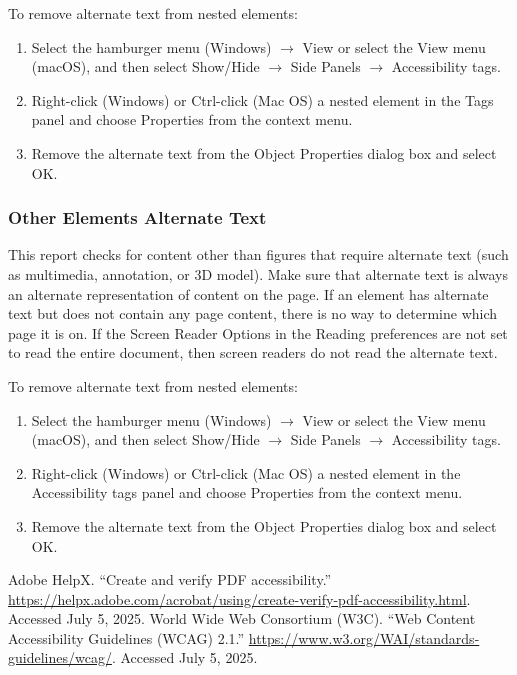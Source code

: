 To remove alternate text from nested elements:
\begin{enumerate}
    \item Select the hamburger menu (Windows) $\rightarrow$ View or select the View menu (macOS), and then select Show/Hide $\rightarrow$ Side Panels $\rightarrow$ Accessibility tags.
    \item Right-click (Windows) or Ctrl-click (Mac OS) a nested element in the Tags panel and choose Properties from the context menu.
    \item Remove the alternate text from the Object Properties dialog box and select OK.
\end{enumerate}

\subsubsection{Other Elements Alternate Text}
This report checks for content other than figures that require alternate text (such as multimedia, annotation, or 3D model). Make sure that alternate text is always an alternate representation of content on the page. If an element has alternate text but does not contain any page content, there is no way to determine which page it is on. If the Screen Reader Options in the Reading preferences are not set to read the entire document, then screen readers do not read the alternate text.\cite{WCAG}

To remove alternate text from nested elements:
\begin{enumerate}
    \item Select the hamburger menu (Windows) $\rightarrow$ View or select the View menu (macOS), and then select Show/Hide $\rightarrow$ Side Panels $\rightarrow$ Accessibility tags.
    \item Right-click (Windows) or Ctrl-click (Mac OS) a nested element in the Accessibility tags panel and choose Properties from the context menu.
    \item Remove the alternate text from the Object Properties dialog box and select OK.
\end{enumerate}

\begin{thebibliography}{99}
 Adobe HelpX. ``Create and verify PDF accessibility.'' \url{https://helpx.adobe.com/acrobat/using/create-verify-pdf-accessibility.html}. Accessed July 5, 2025.
 World Wide Web Consortium (W3C). ``Web Content Accessibility Guidelines (WCAG) 2.1.'' \url{https://www.w3.org/WAI/standards-guidelines/wcag/}. Accessed July 5, 2025.
\end{thebibliography}
